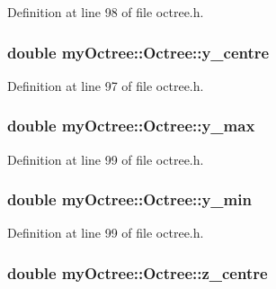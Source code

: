 Definition at line 98 of file octree.\+h.

\hypertarget{classmy_octree_1_1_octree_aa771f7943a94365aadb387a596b37716}{}
\subsubsection[{y\+\_\+centre}]{\setlength{\rightskip}{0pt plus 5cm}double my\+Octree\+::\+Octree\+::y\+\_\+centre}\label{classmy_octree_1_1_octree_aa771f7943a94365aadb387a596b37716}


Definition at line 97 of file octree.\+h.

\hypertarget{classmy_octree_1_1_octree_adc54149b3555e1ed3d9a94e14cfbfd4f}{}
\subsubsection[{y\+\_\+max}]{\setlength{\rightskip}{0pt plus 5cm}double my\+Octree\+::\+Octree\+::y\+\_\+max}\label{classmy_octree_1_1_octree_adc54149b3555e1ed3d9a94e14cfbfd4f}


Definition at line 99 of file octree.\+h.

\hypertarget{classmy_octree_1_1_octree_a3a634a2744d467d6cc6393c35c34edd4}{}
\subsubsection[{y\+\_\+min}]{\setlength{\rightskip}{0pt plus 5cm}double my\+Octree\+::\+Octree\+::y\+\_\+min}\label{classmy_octree_1_1_octree_a3a634a2744d467d6cc6393c35c34edd4}


Definition at line 99 of file octree.\+h.

\hypertarget{classmy_octree_1_1_octree_a77e1cbfe3f0c11f2dd7bb682a1f2bc1e}{}
\subsubsection[{z\+\_\+centre}]{\setlength{\rightskip}{0pt plus 5cm}double my\+Octree\+::\+Octree\+::z\+\_\+centre}\label{classmy_octree_1_1_octree_a77e1cbfe3f0c11f2dd7bb682a1f2bc1e}



